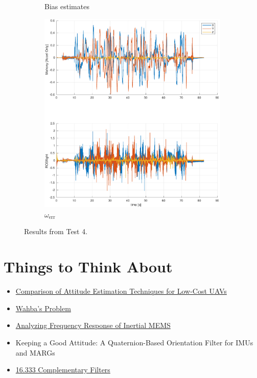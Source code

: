 \documentclass[a4paper]{article}
\begin{document}
\begin{figure}[H]
\begin{subfigure}[t]{0.31\textwidth}
    \caption{Bias estimates}
    \label{fig:scf_est}
  \end{subfigure}\hfill
  \begin{subfigure}[t]{0.31\textwidth}
    \includegraphics[width=\textwidth]{werr_accel_ext15.pdf}
    \caption{$\omega_\text{err}$}
    \label{fig:scf_bode}
  \end{subfigure}
  \caption{Results from Test 4.}
  \label{fig:scf}
\end{figure}

\section*{Things to Think About}
\begin{itemize}
  \item \href{https://arxiv.org/pdf/1602.07733.pdf}{Comparison of Attitude Estimation Techniques for Low-Cost UAVs}
  \item \href{https://en.wikipedia.org/wiki/Wahba%27s_problem}{Wahba's Problem}
  \item \href{https://www.analog.com/media/en/analog-dialogue/volume-46/number-3/articles/analyzing-frequency-response-of-inertial-mems.pdf}{Analyzing Frequency Response of Inertial MEMS}
  \item Keeping a Good Attitude: A Quaternion-Based Orientation Filter for IMUs and MARGs
  \item \href{https://ocw.mit.edu/courses/aeronautics-and-astronautics/16-333-aircraft-stability-and-control-fall-2004/lecture-notes/lecture_15.pdf}{16.333 Complementary Filters}
\end{itemize}



\end{document}
